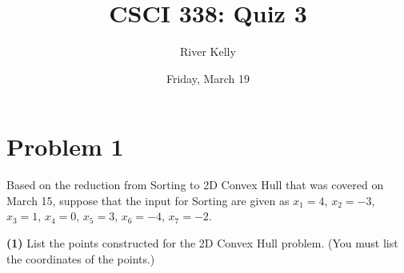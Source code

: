 \documentclass[11pt]{article}
\title{CSCI 338: Quiz 3}
\author{River Kelly}
\date{Friday, March 19}
\begin{document}
\maketitle
\section*{Problem 1}
Based on the reduction from Sorting to 2D Convex Hull that was covered on March
15, suppose that the input for Sorting are given as 
$x_{1} = 4$, 
$x_{2} = -3$, 
$x_{3} = 1$, 
$x_{4} = 0$, 
$x_{5} = 3$, 
$x_{6} = -4$, 
$x_{7} = -2$.
\newline


\vspace{5pt}
\noindent
\textbf{(1)} List the points constructed for the 2D Convex Hull problem. (You must list the
coordinates of the points.)
\newline
\noindent
\end{document}
